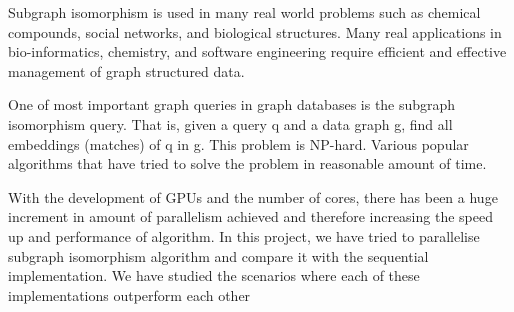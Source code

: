 \abstract


\vspace*{24pt}

Subgraph isomorphism is used in many real world problems such as chemical compounds, social networks, and biological structures. Many real applications in bio-informatics, chemistry, and software engineering require efficient and effective management of graph structured data.

One of most important graph queries in graph databases is the subgraph isomorphism query. That is, given a query q and a data graph g, find all embeddings (matches) of q in g. This problem is NP-hard. Various popular algorithms that have tried to solve the problem in reasonable amount of time.

With the development of GPUs and the number of cores, there has been a huge increment in amount of parallelism achieved and therefore increasing the speed up and performance of algorithm. In this project, we have tried to parallelise subgraph isomorphism algorithm and compare it with the sequential implementation. We have studied the scenarios where each of these implementations outperform each other

\pagebreak